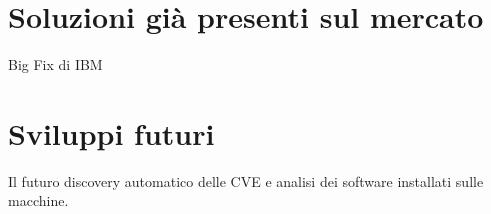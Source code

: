 
\section{Soluzioni già presenti sul mercato}
Big Fix di IBM

\section{Sviluppi futuri}
Il futuro discovery automatico delle CVE e analisi dei software installati sulle macchine.
